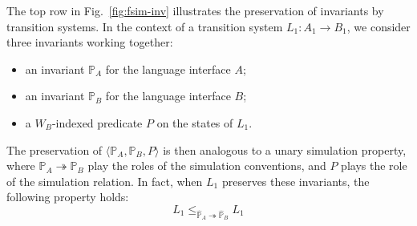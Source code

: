 \documentclass[sigplan,screen]{acmart}
\newenvironment{optional}{}{}
\begin{document}
\begin{optional}
\begin{figure*}
  \caption{Simulation with invariants.
    Circles indicate questions, answers and states
    which satisfy the appropriate invariants.
    When the transition system $L_1$ preserves the invariants
    in the way shown in the top row,
    a simulation of $L_1$ by $L_2$ can be established through
    the weakened diagrams shown in the bottom row.
    The resulting simulation uses the convention
    $\mathbb{P}_A \cdot \mathbb{R}_A \twoheadrightarrow
     \mathbb{P}_B \cdot \mathbb{R}_B$,
    ensuring that the environment
    establishes and preserves the appropriate invariants
    on questions and answers.
    The simulation relation $P \cdot R$ then ensures that
    the strengthened assumptions used by the
    weakened simulation diagrams can be satisfied.}
  \label{fig:fsim-inv}
\end{figure*}

The top row in Fig.~\ref{fig:fsim-inv}
illustrates the preservation of invariants by transition systems.
In the context of a transition system
$L_1 : A_1 \rightarrow B_1$,
we consider three invariants working together:
\begin{itemize}
  \item an invariant $\mathbb{P}_A$ for the language interface $A$;
  \item an invariant $\mathbb{P}_B$ for the language interface $B$;
  \item a $W_B$-indexed predicate $P$ on the states of $L_1$.
\end{itemize}
The preservation of
$\langle \mathbb{P}_A, \mathbb{P}_B, P \rangle$
is then analogous to a unary simulation property,
where $\mathbb{P}_A \twoheadrightarrow \mathbb{P}_B$
play the roles of the simulation conventions,
and $P$ plays the role of the simulation relation.
In fact,
when $L_1$ preserves these invariants,
the following property holds:
\[
    L_1 \le_{\hat{\mathbb{P}}_A \twoheadrightarrow \hat{\mathbb{P}}_B} L_1
\]


\end{optional}
\end{document}
